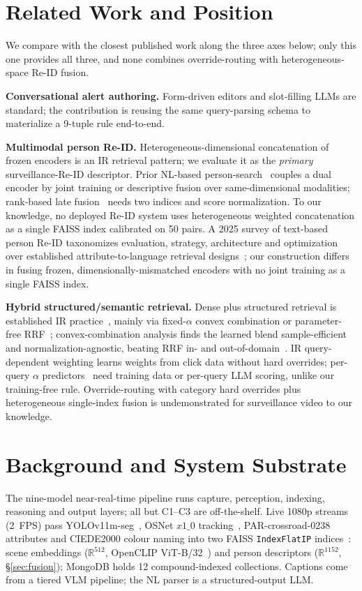 ﻿\documentclass[conference]{IEEEtran}
\theoremstyle{plain}
\begin{document}
\section{Related Work and Position}

We compare with the closest published work along the three axes below; only this one provides all three, and none combines override-routing with heterogeneous-space Re-ID fusion.

\textbf{Conversational alert authoring.} Form-driven editors and slot-filling LLMs are standard; the contribution is reusing the same query-parsing schema to materialize a 9-tuple rule end-to-end.

\textbf{Multimodal person Re-ID.} Heterogeneous-dimensional concatenation of frozen encoders is an IR retrieval pattern; we evaluate it as the \emph{primary} surveillance-Re-ID descriptor. Prior NL-based person-search~\cite{b32} couples a dual encoder by joint training or descriptive fusion over same-dimensional modalities; rank-based late fusion~\cite{b27} needs two indices and score normalization. To our knowledge, no deployed Re-ID system uses heterogeneous weighted concatenation as a single FAISS index calibrated on 50 pairs. A 2025 survey of text-based person Re-ID taxonomizes evaluation, strategy, architecture and optimization over established attribute-to-language retrieval designs~\cite{b36}; our construction differs in fusing frozen, dimensionally-mismatched encoders with no joint training as a single FAISS index.

\textbf{Hybrid structured/semantic retrieval.} Dense plus structured retrieval is established IR practice~\cite{b25,b27,b29}, mainly via fixed-$\alpha$ convex combination or parameter-free RRF~\cite{b27}; convex-combination analysis finds the learned blend sample-efficient and normalization-agnostic, beating RRF in- and out-of-domain~\cite{b33}. IR query-dependent weighting learns weights from click data without hard overrides; per-query $\alpha$ predictors~\cite{b34} need training data or per-query LLM scoring, unlike our training-free rule. Override-routing with category hard overrides plus heterogeneous single-index fusion is undemonstrated for surveillance video to our knowledge.

\section{Background and System Substrate}

The nine-model near-real-time pipeline runs capture, perception, indexing, reasoning and output layers; all but C1--C3 are off-the-shelf. Live 1080p streams (2~FPS) pass YOLOv11m-seg~\cite{b14}, OSNet $x1\_0$ tracking~\cite{b22b}, PAR-crossroad-0238 attributes and CIEDE2000 colour naming into two FAISS \texttt{IndexFlatIP} indices~\cite{b25}: scene embeddings ($\mathbb{R}^{512}$, OpenCLIP ViT-B/32~\cite{b18b}) and person descriptors ($\mathbb{R}^{1152}$, \S\ref{sec:fusion}); MongoDB holds 12 compound-indexed collections. Captions come from a tiered VLM pipeline; the NL parser is a structured-output LLM.
\end{document}
